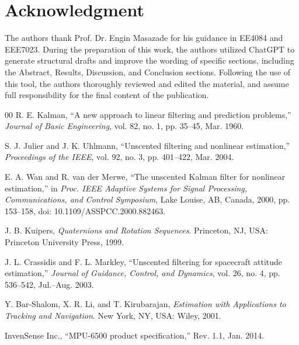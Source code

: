 \documentclass[conference]{IEEEtran}
\begin{document}
\section*{Acknowledgment}
The authors thank Prof. Dr. Engin Masazade for his guidance in EE4084 and EEE7023. During the preparation of this work, the authors utilized ChatGPT to generate structural drafts and improve the wording of specific sections, including the Abstract, Results, Discussion, and Conclusion sections. Following the use of this tool, the authors thoroughly reviewed and edited the material, and assume full responsibility for the final content of the publication.

\begin{thebibliography}{00}
R. E. Kalman, ``A new approach to linear filtering and prediction problems,'' \textit{Journal of Basic Engineering}, vol. 82, no. 1, pp. 35--45, Mar. 1960.

S. J. Julier and J. K. Uhlmann, ``Unscented filtering and nonlinear estimation,'' \textit{Proceedings of the IEEE}, vol. 92, no. 3, pp. 401--422, Mar. 2004.

E. A. Wan and R. van der Merwe, ``The unscented Kalman filter for nonlinear estimation,'' in \textit{Proc. IEEE Adaptive Systems for Signal Processing, Communications, and Control Symposium}, Lake Louise, AB, Canada, 2000, pp. 153--158, doi: 10.1109/ASSPCC.2000.882463.

J. B. Kuipers, \textit{Quaternions and Rotation Sequences}. Princeton, NJ, USA: Princeton University Press, 1999.

J. L. Crassidis and F. L. Markley, ``Unscented filtering for spacecraft attitude estimation,'' \textit{Journal of Guidance, Control, and Dynamics}, vol. 26, no. 4, pp. 536--542, Jul.--Aug. 2003.

Y. Bar-Shalom, X. R. Li, and T. Kirubarajan, \textit{Estimation with Applications to Tracking and Navigation}. New York, NY, USA: Wiley, 2001.

InvenSense Inc., ``MPU-6500 product specification,'' Rev. 1.1, Jan. 2014.
\end{thebibliography}
\end{document}
